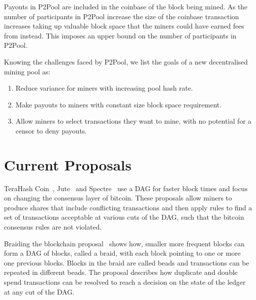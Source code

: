\documentclass{article}
\begin{document}
Payouts in P2Pool are included in the coinbase of the block being
mined. As the number of participants in P2Pool increase the size of
the coinbase transaction increases taking up valuable block space that
the miners could have earned fees from instead. This imposes an upper
bound on the number of participants in P2Pool.

Knowing the challenges faced by P2Pool, we list the goals of a new
decentralised mining pool as:

\begin{enumerate}
\item Reduce variance for miners with increasing pool hash rate.
\item Make payouts to miners with constant size block space
  requirement.
\item Allow miners to select transactions they want to mine, with no
  potential for a censor to deny payouts.
\end{enumerate}

\section{Current Proposals}

TeraHash Coin~\cite{mcelrath:variance}, Jute~\cite{jute} and
Spectre~\cite{spectre} use a DAG for faster block times and focus on
changing the consensus layer of bitcoin. These proposals allow miners
to produce shares that include conflicting transactions and then apply
rules to find a set of transactions acceptable at various cuts of the
DAG, such that the bitcoin consensus rules are not violated.

Braiding the blockchain proposal~\cite{mcelrath:variance} shows how,
smaller more frequent blocks can form a DAG of blocks, called a braid,
with each block pointing to one or more one previous blocks. Blocks in
the braid are called beads and transactions can be repeated in
different beads. The proposal describes how duplicate and double spend
transactions can be resolved to reach a decision on the state of the
ledger at any cut of the DAG.\@

\end{document}
